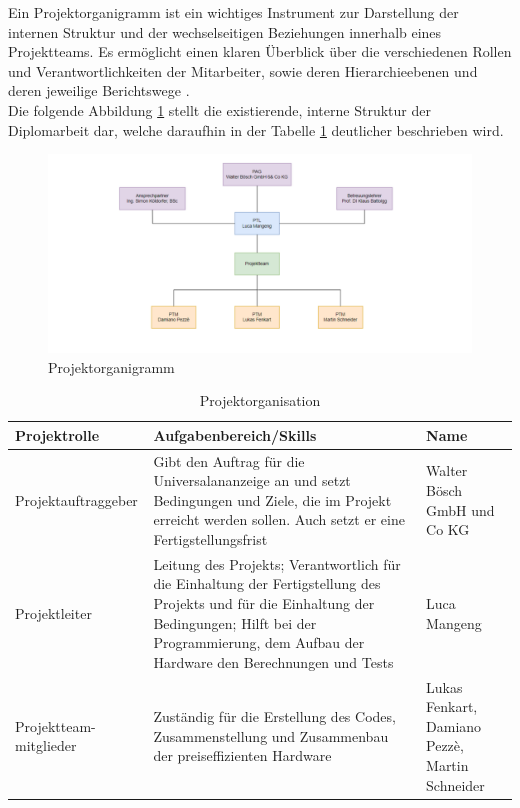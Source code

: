 Ein Projektorganigramm ist ein wichtiges Instrument zur Darstellung der internen Struktur und der wechselseitigen Beziehungen innerhalb eines Projektteams. Es ermöglicht einen klaren Überblick über die verschiedenen Rollen und Verantwortlichkeiten der Mitarbeiter, sowie deren Hierarchieebenen und deren jeweilige Berichtswege \cite[vgl.][]{projektmanagement-definitionen:2009}. \\
Die folgende Abbildung \ref{fig:organigramm} stellt die existierende, interne Struktur der Diplomarbeit dar, welche daraufhin in der Tabelle \ref{tab:projektorganisation} deutlicher beschrieben wird.

\begin{figure}[H]
	\centering
	\includegraphics[width=0.9\linewidth]{Bilder/Organigramm}
	\caption{Projektorganigramm}
	\label{fig:organigramm}
\end{figure}

\begin{table}[H]
	\caption{Projektorganisation}
	\label{tab:projektorganisation}
	\begin{tabular}{p{} | p{} | p{}}
		\toprule
		\textbf{Projektrolle} & \textbf{Aufgabenbereich/Skills} & \textbf{Name} \\
		\midrule
		Projektauftraggeber & Gibt den Auftrag für die Universalananzeige an und setzt Bedingungen und Ziele, die im Projekt erreicht werden sollen. Auch setzt er eine Fertigstellungsfrist & Walter Bösch GmbH und Co KG
		\\
		\midrule
		Projektleiter & Leitung des Projekts;
		Verantwortlich für die Einhaltung der Fertigstellung des Projekts und für die Einhaltung der Bedingungen; Hilft bei der Programmierung, dem Aufbau der Hardware den Berechnungen und Tests
		 & Luca Mangeng
		\\
		\midrule
		Projektteam-mitglieder & Zuständig für die Erstellung des Codes, Zusammenstellung und Zusammenbau der preiseffizienten Hardware & 
		Lukas Fenkart, Damiano Pezzè, Martin Schneider
		\\
		\bottomrule
	\end{tabular}
\end{table}